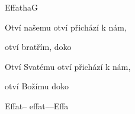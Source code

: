 \begin{song}{Effatha}{G}{}
\begin{SBChorus*}
Otví našemu  otví přichází k nám,

otví bratřím,  doko

Otví Svatému  otví přichází k nám, 

otví Božímu  doko 

Effat-- effat----Effa
\end{SBChorus*}
\end{song}
